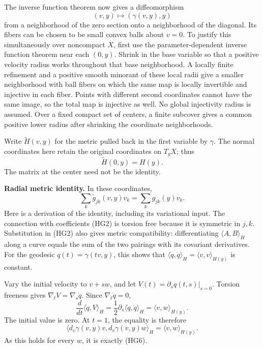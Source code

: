 \documentclass[
  11pt,
]{article}
\begin{document}
The inverse function theorem now gives a diffeomorphism \[
 (v,y)\longmapsto(\gamma(v,y),y)                                \tag{HG4}
\] from a neighborhood of the zero section onto a neighborhood of the
diagonal. Its fibers can be chosen to be small convex balls about
\(v=0\). To justify this simultaneously over noncompact \(X\), first use
the parameter-dependent inverse function theorem near each \((0,y)\).
Shrink in the base variable so that a positive velocity radius works
throughout that base neighborhood. A locally finite refinement and a
positive smooth minorant of these local radii give a smaller
neighborhood with ball fibers on which the same map is locally
invertible and injective in each fiber. Points with different second
coordinates cannot have the same image, so the total map is injective as
well. No global injectivity radius is assumed. Over a fixed compact set
of centers, a finite subcover gives a common positive lower radius after
shrinking the coordinate neighborhoods.

Write \(\widetilde H(v,y)\) for the metric pulled back in the first
variable by \(\gamma\). The normal coordinates here retain the original
coordinates on \(T_yX\); thus \[
                       \widetilde H(0,y)=H(y).                  \tag{HG5}
\] The matrix at the center need not be the identity.

\textbf{Radial metric identity.} In these coordinates, \[
       \sum_k\widetilde g_{jk}(v,y)v_k
                 =\sum_k g_{jk}(y)v_k.                         \tag{HG6}
\] Here is a derivation of the identity, including its variational
input. The connection with coefficients (HG2) is torsion free because it
is symmetric in \(j,k\). Substitution in (HG2) also gives metric
compatibility: differentiating \(\langle A,B\rangle_H\) along a curve
equals the sum of the two pairings with its covariant derivatives. For
the geodesic \(q(t)=\gamma(tv,y)\), this shows that
\(\langle\dot q,\dot q\rangle_H=\langle v,v\rangle_{H(y)}\) is constant.

Vary the initial velocity to \(v+sw\), and let
\(V(t)=\partial_s q(t,s)|_{s=0}\). Torsion freeness gives
\(\nabla_tV=\nabla_s\dot q\). Since \(\nabla_t\dot q=0\), \[
 \frac d{dt}\langle\dot q,V\rangle_H
       =\frac12\partial_s\langle\dot q,\dot q\rangle_H
       =\langle v,w\rangle_{H(y)}.                             \tag{HG7}
\] The initial value is zero. At \(t=1\), the equality is therefore \[
 \big\langle d_v\gamma(v,y)v,d_v\gamma(v,y)w\big\rangle_H
                         =\langle v,w\rangle_{H(y)}.
\] As this holds for every \(w\), it is exactly (HG6).
\end{document}
